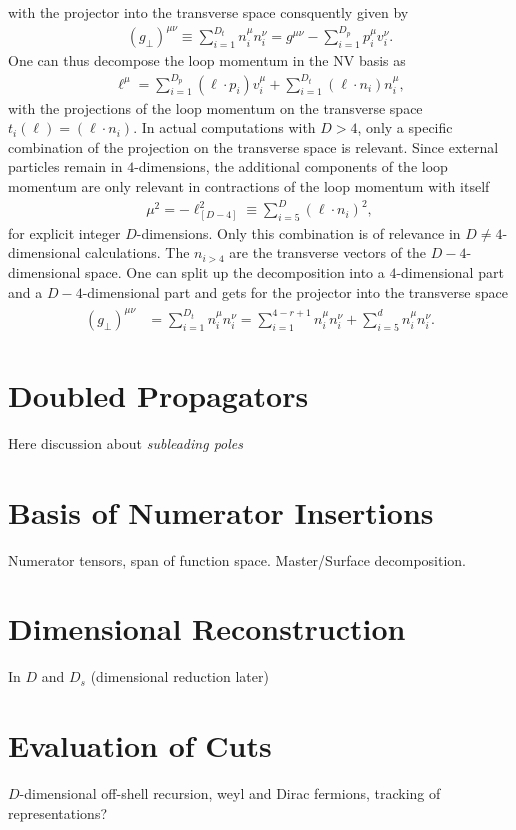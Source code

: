 with the projector into the transverse space consquently given by
\begin{align}\label{eq:metricpron}
  (g_\perp)^{\mu\nu} \equiv  \sum_{i=1}^{D_t}n_i^\mu n_i^\nu = g^{\mu\nu}- \sum_{i=1}^{D_p}p_i^\mu v_i^\nu.
\end{align}
One can thus decompose the loop momentum in the NV basis as 
\begin{align}
  \ell^\mu = \sum_{i=1}^{D_p}(\ell\cdot p_i)
  v_i^\mu+\sum_{i=1}^{D_t}(\ell\cdot n_i) n_i^\mu,
\end{align}
with the projections of the loop momentum on the transverse space
$t_i(\ell) = (\ell \cdot n_i)$.  In actual computations with $D>4$, only a specific combination of the
projection on the transverse space is relevant. Since external
particles remain in $4$-dimensions, the additional components of the
loop momentum are only relevant in contractions of the loop momentum
with itself
\begin{align}
  \mu^2 = -\ell_{[D-4]}^2 \equiv \sum_{i=5}^D(\ell \cdot n_i)^2,
\end{align}
for explicit integer $D$-dimensions. Only this combination is of
relevance in $D\neq 4$-dimensional calculations. The $n_{i>4}$ are the transverse
vectors of the $D-4$-dimensional space. One can split up the
decomposition into a $4$-dimensional part and a $D-4$-dimensional part
and gets for the projector into the transverse space
\begin{align}\label{eq:metricprond}
\begin{split}
  (g_\perp)^{\mu\nu} &=  \sum_{i=1}^{D_t}n_i^\mu n_i^\nu=\sum_{i=1}^{4-r+1}n_i^\mu n_i^\nu +  \sum_{i=5}^{d}n_i^\mu n_i^\nu.
\end{split}
\end{align}


\section{Doubled Propagators}
Here discussion about \textit{subleading poles}

\section{Basis of Numerator Insertions}
Numerator tensors, span of function space. Master/Surface decomposition.



\section{Dimensional Reconstruction}
 In $D$ and $D_s$ (dimensional reduction later)

\section{Evaluation of Cuts}
$D$-dimensional off-shell recursion, weyl and Dirac fermions, tracking of representations?



